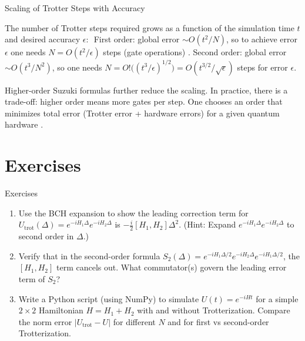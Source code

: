 \documentclass{beamer}
\begin{document}
\begin{frame}{Scaling of Trotter Steps with Accuracy}

The number of Trotter steps required grows as a function of the simulation time $t$ and desired accuracy $\epsilon$: 
First order: global error $\sim O(t^2/N)$, so to achieve error $\epsilon$ one needs $N = O(t^2/\epsilon)$ steps (gate operations) .
Second order: global error $\sim O(t^3/N^2)$, so one needs $N = O!\big((t^3/\epsilon)^{1/2}\big) = O(t^{3/2}/\sqrt{\epsilon})$ steps for error $\epsilon$.

Higher-order Suzuki formulas further reduce the scaling. In practice, there is a trade-off: higher order means more gates per step. One chooses an order that minimizes total error (Trotter error + hardware errors) for a given quantum hardware . \end{frame}


\section{Exercises}

\begin{frame}{Exercises}
\begin{enumerate}
\item Use the BCH expansion to show the leading correction term for $U_{\text{trot}}(\Delta) = e^{-iH_1\Delta}e^{-iH_2\Delta}$ is $-\tfrac{i}{2}[H_1,H_2]\Delta^2$.  (Hint: Expand $e^{-iH_1\Delta}e^{-iH_2\Delta}$ to second order in $\Delta$.)
\item Verify that in the second-order formula $S_2(\Delta)=e^{-iH_1\Delta/2}e^{-iH_2\Delta}e^{-iH_1\Delta/2}$, the $[H_1,H_2]$ term cancels out. What commutator(s) govern the leading error term of $S_2$?
\item Write a Python script (using NumPy) to simulate $U(t)=e^{-iHt}$ for a simple $2\times2$ Hamiltonian $H=H_1+H_2$ with and without Trotterization. Compare the norm error $|U_{\text{trot}} - U|$ for different $N$ and for first vs second-order Trotterization.
\end{enumerate}
\end{frame}
\end{document}
